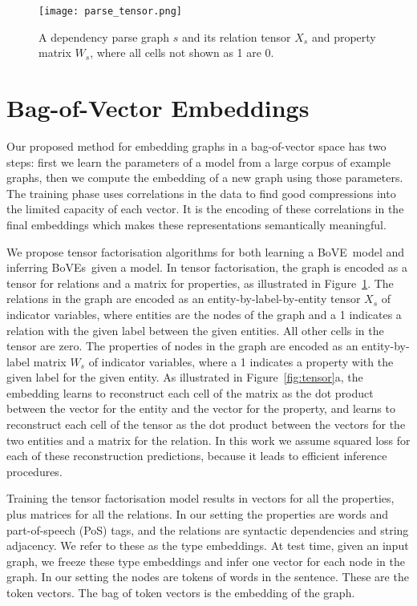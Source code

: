 \documentclass[11pt,a4paper]{article}
\newcommand{\bove}{Bo{\nolinebreak\hspace{-0.25ex}}VE}
\newcommand{\boves}{Bo{\nolinebreak\hspace{-0.25ex}}VEs}
\begin{document}
\begin{figure}[tb]
  \centerline{\texttt{[image: parse\_tensor.png]}}
  \caption{A dependency parse graph $s$ and its relation tensor $X_s$ and
    property matrix $W_s$, where all cells not shown as 1 are 0.}
  \label{fig:parse}
\end{figure}


\section{Bag-of-Vector Embeddings}

Our proposed method for embedding graphs in a bag-of-vector space has two
steps: first we learn the parameters of a model from a large corpus of example
graphs, then we compute the embedding of a new graph using those parameters.
The training phase uses correlations in the data to find good compressions
into the limited capacity of each vector.  It is the encoding of these
correlations in the final embeddings which makes these representations
semantically meaningful. 

We propose tensor factorisation algorithms for both learning a \bove\ model
and inferring \boves\ given a model.  In tensor factorisation, the graph is
encoded as a tensor for relations and a matrix for properties, as illustrated
in Figure~\ref{fig:parse}.  The relations
in the graph are encoded as an entity-by-label-by-entity tensor $X_s$ of indicator
variables, where entities are the nodes of the graph and a 1 indicates a
relation with the given label between the given entities.  All other cells in
the tensor are zero.  The properties of nodes in the graph are encoded as an
entity-by-label matrix $W_s$ of indicator variables, where a 1 indicates a
property with the given label for the given entity.  As illustrated in
Figure~\ref{fig:tensor}a, the embedding
learns to reconstruct each cell of the matrix as the dot product between the
vector for the entity and the vector for the property, and learns to
reconstruct each cell of the tensor as the dot product between the vectors for
the two entities and a matrix for the relation.  In this work we assume
squared loss for each of these reconstruction predictions, because it leads to
efficient inference procedures.

Training the tensor factorisation model results in vectors for all the
properties, plus matrices for all the relations.  In our setting the
properties are words and part-of-speech (PoS) tags, and the relations are
syntactic dependencies and string adjacency.  We refer to these as the type
embeddings.  At test time, given an input graph, we freeze these type
embeddings and infer one vector for each node in the graph.  In our setting
the nodes are tokens of words in the sentence.  These are the token vectors.
The bag of token vectors is the embedding of the graph.
\end{document}
